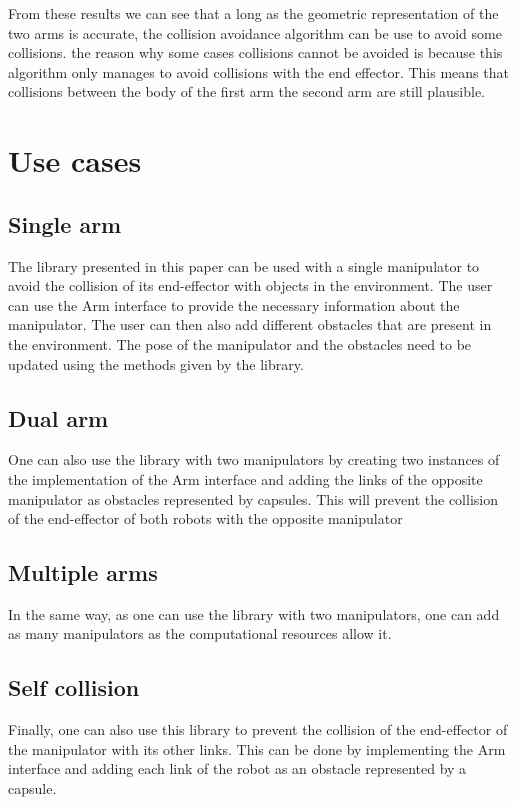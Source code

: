 \documentclass[a4paper, 10pt, conference]{ieeeconf}      %
\begin{document}
From these results we can see that a long as the geometric representation of the two arms is accurate, the collision avoidance algorithm can be use to avoid some collisions. the reason why some cases collisions cannot be avoided is because this algorithm only manages to avoid collisions with the end effector. This means that collisions between the body of the first arm the second arm are still plausible. 

\section{Use cases}

\subsection{Single arm} %
The library presented in this paper can be used with a single manipulator to avoid the collision of its end-effector with objects in the environment.
The user can use the Arm interface to provide the necessary information about the manipulator.
The user can then also add different obstacles that are present in the environment.
The pose of the manipulator and the obstacles need to be updated using the methods given by the library.
\subsection{Dual arm} %
One can also use the library with two manipulators by creating two instances of the implementation of the Arm interface and adding the links of 
the opposite manipulator as obstacles represented by capsules.
This will prevent the collision of the end-effector of both robots with the opposite manipulator
\subsection{Multiple arms}
In the same way, as one can use the library with two manipulators, one can add as many manipulators as the computational resources allow it.
\subsection{Self collision} %
Finally, one can also use this library to prevent the collision of the end-effector of the manipulator with its other links.
This can be done by implementing the Arm interface and adding each link of the robot as an obstacle represented by a capsule.
\end{document}
